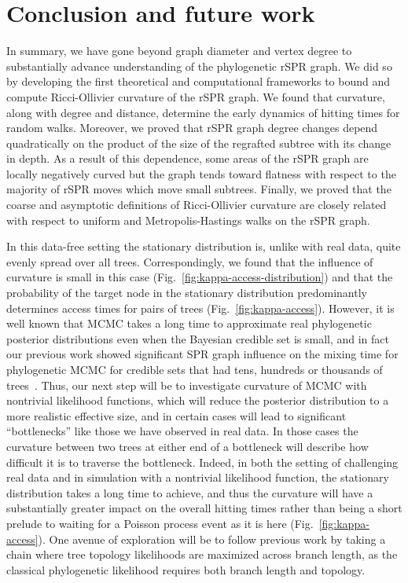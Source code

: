 \documentclass[]{elsarticle}
\begin{document}
\section{Conclusion and future work}
In summary, we have gone beyond graph diameter and vertex degree to substantially advance understanding of the phylogenetic rSPR graph.
We did so by developing the first theoretical and computational frameworks to bound and compute Ricci-Ollivier curvature of the rSPR graph.
We found that curvature, along with degree and distance, determine the early dynamics of hitting times for random walks.
Moreover, we proved that rSPR graph degree changes depend quadratically on the product of the size of the regrafted subtree with its change in depth.
As a result of this dependence, some areas of the rSPR graph are locally negatively curved but the graph tends toward flatness with respect to the majority of rSPR moves which move small subtrees.
Finally, we proved that the coarse and asymptotic definitions of Ricci-Ollivier curvature are closely related with respect to uniform and Metropolis-Hastings walks on the rSPR graph.


In this data-free setting the stationary distribution is, unlike with real data, quite evenly spread over all trees.
Correspondingly, we found that the influence of curvature is small in this case (Fig.~\ref{fig:kappa-access-distribution}) and that the probability of the target node in the stationary distribution predominantly determines access times for pairs of trees (Fig.~\ref{fig:kappa-access}).
However, it is well known that MCMC takes a long time to approximate real phylogenetic posterior distributions even when the Bayesian credible set is small, and in fact our previous work showed significant SPR graph influence on the mixing time for phylogenetic MCMC for credible sets that had tens, hundreds or thousands of trees~\citep{Whidden2015-yi}.
Thus, our next step will be to investigate curvature of MCMC with nontrivial likelihood functions, which will reduce the posterior distribution to a more realistic effective size, and in certain cases will lead to significant ``bottlenecks'' like those we have observed in real data.
In those cases the curvature between two trees at either end of a bottleneck will describe how difficult it is to traverse the bottleneck.
Indeed, in both the setting of challenging real data and in simulation with a nontrivial likelihood function, the stationary distribution takes a long time to achieve, and thus the curvature will have a substantially greater impact on the overall hitting times rather than being a short prelude to waiting for a Poisson process event as it is here (Fig.~\ref{fig:kappa-access}).
One avenue of exploration will be to follow previous work \citep{Stefankovic2011-hu} by taking a chain where tree topology likelihoods are maximized across branch length, as the classical phylogenetic likelihood \citep{felsenstein1981evolutionary} requires both branch length and topology.
\end{document}
